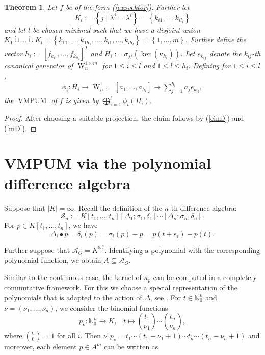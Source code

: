 \documentclass[a4paper,10pt]{article}
\newtheorem{Th}{Theorem}[section]
\theoremstyle{nonumberplain}
\newtheorem{proof}{Proof}
\newcommand{\N}{\mathbb{N}}
\DeclareMathOperator{\W}{W}
\DeclareMathOperator{\VMPUM}{VMPUM}
\begin{document}
\begin{Th}
Let $f$ be of the form (\ref{expvektor}). Further let 
\[ K_i:= \left\lbrace j \; | \; \lambda^j= \lambda^i \right\rbrace = \left\lbrace  k_{i1}, \dots, k_{i l_i}\right\rbrace \] 
and let $l$ be 
chosen minimal such that we have a disjoint union $K_1 \dot \cup \dots \dot \cup K_l = \left\lbrace k_{11}, \dots, k_{1h_1}, \dots, k_{l1}, \dots, k_{lh_l} \right\rbrace =\left\lbrace 1, \dots, m \right\rbrace $. Further define the vector $h_i:=[f_{k_{i1}}, \dots, f_{k_{il_i}}]^{T}$ and $H_i:=\sigma_{\lambda^i}( \ker(\kappa_{h_i}) )$. Let  $e_{k_{ij}}$ denote the $k_{ij}$-th canonical generator of $\W_n^{1 \times m}$ for $1\leq i \leq l$ and $1 \leq l \leq h_i$. Defining for $1 \leq i \leq l$,
\begin{eqnarray*}
\phi_i: H_i \rightarrow \W_n , \;\;\; [a_1, \dots, a_{h_i}] \mapsto \sum_{j=1}^{h_i} a_j e_{k_{ij}}, 
\end{eqnarray*}
the $\VMPUM$ of $f$ is given by $ \bigoplus_{i=1}^l \phi_i(H_i)$.
\end{Th}
\begin{proof}
After choosing a suitable projection, the claim follows by (\ref{einD}) and (\ref{mD}).
\end{proof}









\section{VMPUM via the polynomial difference algebra}

Suppose that $|K|=\infty$. 
Recall the definition of the $n$-th difference algebra:
$$ 
\mathcal{S}_n:=K[t_1, \dots, t_n][\Delta_1; \sigma_1, \delta_1] \cdots [\Delta_n; \sigma_n, \delta_n].
$$
For $p\in K[t_1, \dots, t_n]$, we have
$$
\Delta_i \bullet p = \delta_i(p)=\sigma_i(p)-p=p(t+e_i)-p(t).
$$

Further suppose that $\mathcal{A}_O=K^{\N_0^n}$. 
Identifying a polynomial with the corresponding polynomial function, we
obtain $A \subseteq \mathcal{A}_O$.

Similar to the continuous case, the kernel of $\kappa_p$ can be 
computed in a completely 
commutative framework. For this we choose a special representation 
of the polynomials 
that is adapted to the action of $\Delta$, see \cite{Eva2}.
For $t \in \N_0^n$ and $\nu=(\nu_1, \dots, \nu_n)$, we consider 
the binomial functions
$$ p_{\nu}: \N_0^n \rightarrow K, \;\;\; t \mapsto  \binom{ t_1 }{ \nu_1 }
\cdots \binom { t_n }{ \nu_n  },$$
where $\binom{t_i }{ 0 } =1$ for all $i$. %
Then 
$ \nu! \, p_{\nu}=t_1 \cdots (t_1-\nu_1+1)  \cdots  t_n \cdots (t_n-\nu_n+1)$
and moreover, each element $p \in A^m$ can be written as
\end{document}
